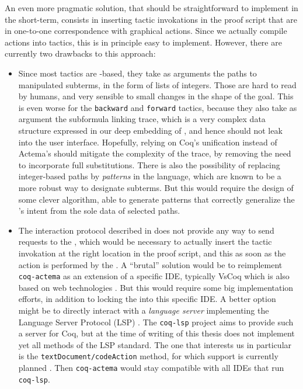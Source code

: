 An even more pragmatic solution, that should be straightforward to implement in
the short-term, consists in inserting tactic invokations in the proof script
that are in one-to-one correspondence with graphical actions. Since we actually
compile actions into tactics, this is in principle easy to implement. However,
there are currently two drawbacks to this approach:
\begin{itemize}
  \item Since most tactics are -based, they take as arguments the
  paths to manipulated subterms, in the form of lists of integers. Those are
  hard to read by humans, and very sensible to small changes in the shape of the
  goal. This is even worse for the \texttt{backward} and \texttt{forward}
  tactics, because they also take as argument the subformula linking trace,
  which is a very complex data structure expressed in our deep embedding of
  , and hence should not leak into the user interface.
  Hopefully, relying on Coq's unification instead of Actema's should mitigate
  the complexity of the trace, by removing the need to incorporate full
  substitutions. There is also the possibility of replacing integer-based paths
  by \emph{patterns} in the {\ssreflect} language, which are known to be a more
  robust way to designate subterms. But this would require the design of some
  clever algorithm, able to generate patterns that correctly generalize the
  's intent from the sole data of selected paths.

  \item The interaction protocol described in  does not provide
  any way to send requests to the , which would be necessary to
  actually insert the tactic invokation at the right location in the proof
  script, and this as soon as the action is performed by the . A
  ``brutal'' solution would be to reimplement \texttt{coq-actema} as an
  extension of a specific IDE, typically VsCoq which is also based on web
  technologies \cite{VsCoq}. But this would require some big implementation
  efforts, in addition to locking the  into this specific IDE. A
  better option might be to directly interact with a \emph{language server}
  implementing the Language Server Protocol (LSP) \cite{LSP}. The
  \texttt{coq-lsp} project aims to provide such a server for Coq, but at the
  time of writing of this thesis does not implement yet all methods of the LSP
  standard. The one that interests us in particular is the
  \texttt{textDocument/codeAction} method, for which support is currently
  planned \cite{coq-lsp-proto}. Then \texttt{coq-actema} would stay compatible
  with all IDEs that run \texttt{coq-lsp}.
\end{itemize}
